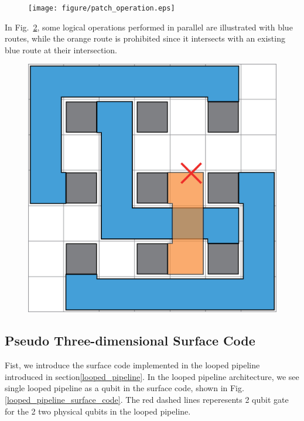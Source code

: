 \documentclass[a4paper,11pt]{ltjsarticle}
\begin{document}
{{        \begin{figure}[h]
            \centering
            \texttt{[image: figure/patch\_operation.eps]}
            \vspace{0pt}\caption{}
            \label{patch_operation}
            \vspace{-10pt}
        \end{figure}
        
        In Fig.~\ref{qubit_plane}, some logical operations performed in parallel are illustrated with blue routes, while the orange route is prohibited since it intersects with an existing blue route at their intersection.
        \clearpage

        \begin{figure}[h]
            \centering
            \includegraphics[scale=0.20]{figure/qubit_plane.eps}
            \vspace{0pt}\caption{}
            \label{qubit_plane}
            \vspace{-10pt}
        \end{figure}
        
    }

    \subsection{Pseudo Three-dimensional Surface Code}{
        Fist, we introduce the surface code implemented in the looped pipeline introduced in section\ref{looped_pipeline}. In the looped pipeline architecture, we see single looped pipeline as a qubit in the surface code, shown in Fig.\ref{looped_pipeline_surface_code}. The red dashed lines reperesents 2 qubit gate for the 2 two physical qubits in the looped pipeline.

}}
\end{document}
